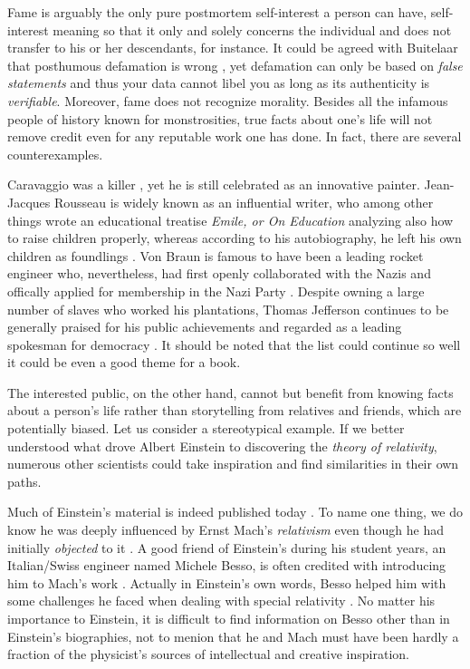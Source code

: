 \documentclass[a4paper]{article}
\begin{document}
Fame is arguably the only pure postmortem self-interest a person can have, self-interest meaning so that it only and solely concerns the individual and does not transfer to his or her descendants, for instance. It could be agreed with Buitelaar that posthumous defamation is wrong \cite{buitelaar}, yet defamation can only be based on \emph{false statements} \cite{leroy} and thus your data cannot libel you as long as its authenticity is \emph{verifiable}. Moreover, fame does not recognize morality. Besides all the infamous people of history known for monstrosities, true facts about one's life will not remove credit even for any reputable work one has done. In fact, there are several counterexamples. 

Caravaggio was a killer \cite{caravaggio}, yet he is still celebrated as an innovative painter. 
Jean-Jacques Rousseau is widely known as an influential writer, who among other things wrote an educational treatise \textit{Emile, or On Education} analyzing also how to raise children properly, whereas according to his autobiography, he left his own children as foundlings \cite{rousseau}. 
Von Braun is famous to have been a leading rocket engineer who, nevertheless, had first openly collaborated with the Nazis and offically applied for membership in the Nazi Party \cite{vonbraun}. 
Despite owning a large number of slaves who worked his plantations, Thomas Jefferson continues to be generally praised for his public achievements and regarded as a leading spokesman for democracy \cite{jefferson}. It should be noted that the list could continue so well it could be even a good theme for a book.

The interested public, on the other hand, cannot but benefit from knowing facts about a person's life rather than storytelling from relatives and friends, which are potentially biased. Let us consider a stereotypical example. 
If we better understood what drove Albert Einstein to discovering the \textit{theory of relativity}, numerous other scientists could take inspiration and find similarities in their own paths. 

Much of Einstein's material is indeed published today \cite{einstein-notes}. To name one thing, we do know he was deeply influenced by Ernst Mach's \textit{relativism} even though he had initially \emph{objected} to it \cite{einstein-inspiration}. A good friend of Einstein's during his student years, an Italian/Swiss engineer named Michele Besso, is often credited with introducing him to Mach's work \cite{einstein-inspiration}. Actually in Einstein's own words, Besso helped him with some challenges he faced when dealing with special relativity \cite{einstein}. 
No matter his importance to Einstein, it is difficult to find information on Besso other than in Einstein's biographies, not to menion that he and Mach must have been hardly a fraction of the physicist's sources of intellectual and creative inspiration. 
\end{document}
